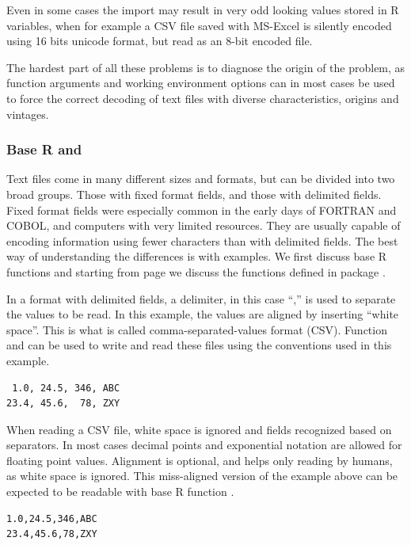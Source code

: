 \documentclass[krantz2]{krantz}\usepackage{knitr}%
\begin{document}
\begin{warningbox}
Even in some cases the import may result in very odd looking values stored in R variables, when for example a CSV file saved with MS-Excel is silently encoded using 16 bits unicode format, but read as an 8-bit encoded file.

The hardest part of all these problems is to diagnose the origin of the problem, as function arguments and working environment options can in most cases be used to force the correct decoding of text files with diverse characteristics, origins and vintages.
\end{warningbox}

\subsubsection[Base R and `utils']{Base R and }

Text files come in many different sizes and formats, but can be divided into two broad groups. Those with fixed format fields, and those with delimited fields. Fixed format fields were especially common in the early days of FORTRAN and COBOL, and computers with very limited resources. They are usually capable of encoding information using fewer characters than with delimited fields. The best way of understanding the differences is with examples. We first discuss base R functions and starting from page \pageref{sec:files:readr} we discuss the functions defined in package .

In a format with delimited fields, a delimiter, in this case ``,'' is used to separate the values to be read. In this example, the values are aligned by inserting ``white space''. This is what is called comma-separated-values format (CSV). Function  and  can be used to write and read these files using the conventions used in this example.
\begin{verbatim}
 1.0, 24.5, 346, ABC
23.4, 45.6,  78, ZXY
\end{verbatim}

When reading a CSV file, white space is ignored and fields recognized based on separators. In most cases decimal points and exponential notation are allowed for floating point values. Alignment is optional, and helps only reading by humans, as white space is ignored. This miss-aligned version of the example above can be expected to be readable with base R function .
\begin{verbatim}
1.0,24.5,346,ABC
23.4,45.6,78,ZXY
\end{verbatim}
\end{document}
